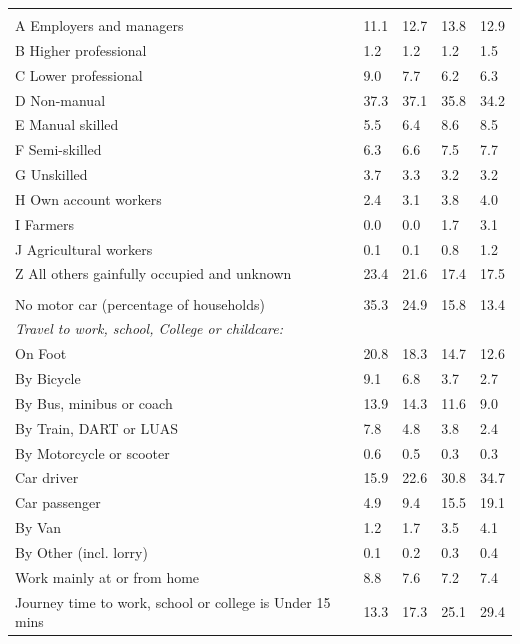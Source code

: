 \documentclass{article}
\begin{document}
\begin{table}[h]
\begin{tabular}{KTTTT}
\hline
    \\ 
    \hline
A Employers and managers & 11.1& 12.7& 13.8& 12.9\\
B Higher professional & 1.2& 1.2& 1.2& 1.5\\
C Lower professional & 9.0& 7.7& 6.2& 6.3\\
D Non-manual & 37.3& 37.1& 35.8& 34.2\\
E Manual skilled & 5.5& 6.4& 8.6& 8.5\\
F Semi-skilled & 6.3& 6.6& 7.5& 7.7\\
G Unskilled & 3.7& 3.3& 3.2& 3.2\\
H Own account workers & 2.4& 3.1& 3.8& 4.0\\
I Farmers & 0.0& 0.0& 1.7& 3.1\\
J Agricultural workers & 0.1& 0.1& 0.8& 1.2\\
Z All others gainfully occupied and unknown & 23.4& 21.6& 17.4& 17.5\\
\hline
{}\hline
    \\ 
    \hline
No motor car (percentage of households) & 35.3& 24.9& 15.8& 
13.4\\
    \hline 
\emph{Travel to work, school, College or childcare:} & & & \\
\quad On Foot & 20.8& 18.3& 14.7& 12.6\\ 
\quad By Bicycle & 9.1& 6.8& 3.7& 2.7\\ 
\quad By Bus, minibus or coach & 13.9& 14.3& 11.6&  9.0\\
\quad By Train, DART or LUAS & 7.8& 4.8& 3.8& 2.4\\
\quad By Motorcycle or scooter & 0.6& 0.5& 0.3& 0.3\\
\quad Car driver & 15.9 & 22.6& 30.8& 34.7\\
\quad Car passenger &  4.9&  9.4& 15.5& 19.1\\
\quad By Van & 1.2& 1.7& 3.5& 4.1\\
\quad By Other (incl. lorry) & 0.1& 0.2& 0.3& 0.4\\
    \hline
Work mainly at or from home & 8.8& 7.6& 7.2& 7.4\\
Journey time to work, school or college is Under 15 mins & 13.3& 17.3& 25.1& 29.4\\

\end{tabular}
\end{table}
\end{document}
